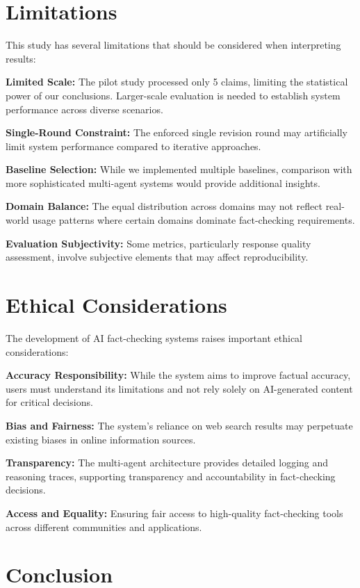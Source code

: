 \documentclass{article}
\begin{document}
\section{Limitations}

This study has several limitations that should be considered when interpreting results:

\textbf{Limited Scale:} The pilot study processed only 5 claims, limiting the statistical power of our conclusions. Larger-scale evaluation is needed to establish system performance across diverse scenarios.

\textbf{Single-Round Constraint:} The enforced single revision round may artificially limit system performance compared to iterative approaches.

\textbf{Baseline Selection:} While we implemented multiple baselines, comparison with more sophisticated multi-agent systems would provide additional insights.

\textbf{Domain Balance:} The equal distribution across domains may not reflect real-world usage patterns where certain domains dominate fact-checking requirements.

\textbf{Evaluation Subjectivity:} Some metrics, particularly response quality assessment, involve subjective elements that may affect reproducibility.

\section{Ethical Considerations}

The development of AI fact-checking systems raises important ethical considerations:

\textbf{Accuracy Responsibility:} While the system aims to improve factual accuracy, users must understand its limitations and not rely solely on AI-generated content for critical decisions.

\textbf{Bias and Fairness:} The system's reliance on web search results may perpetuate existing biases in online information sources.

\textbf{Transparency:} The multi-agent architecture provides detailed logging and reasoning traces, supporting transparency and accountability in fact-checking decisions.

\textbf{Access and Equality:} Ensuring fair access to high-quality fact-checking tools across different communities and applications.

\section{Conclusion}
\end{document}

